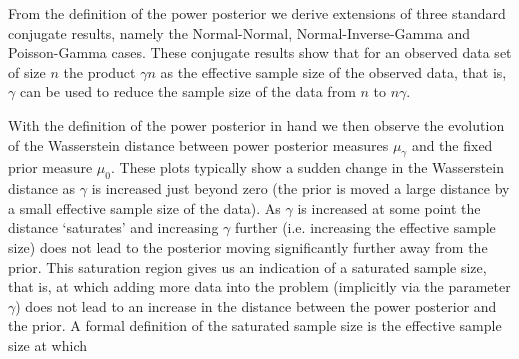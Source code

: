 \documentclass[12pt]{article}
\begin{document}

From the definition of the power posterior we derive extensions of three
standard conjugate results, namely the Normal-Normal, Normal-Inverse-Gamma and
Poisson-Gamma cases. These conjugate results show that for an observed data set
of size $n$ the product $\gamma n$ as the effective sample size of the observed
data, that is, $\gamma$ can be used to reduce the sample size of the data from
$n$ to $n\gamma$. 

With the definition of the power posterior in hand we then observe the
evolution of the Wasserstein distance between power posterior measures
$\mu_{\gamma}$ and the fixed prior measure $\mu_{0}$. These plots typically show a sudden change in the Wasserstein distance as $\gamma$ is increased just beyond zero (the prior is moved a large distance by a small effective sample size of the data). As $\gamma$ is increased at some point the distance `saturates' and increasing $\gamma$ further (i.e. increasing the effective sample size) does not lead to the posterior moving significantly further away from the prior. This saturation region gives us an indication of a saturated sample size, that is, at which adding more data into the problem (implicitly
via the parameter $\gamma$) does not lead to an increase in the distance
between the power posterior and the prior.  A formal definition of the saturated sample size is the effective sample size at which 
\end{document}
